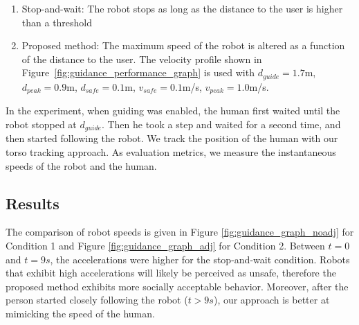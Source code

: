 \begin{enumerate}
\item Stop-and-wait: The robot stops as long as the distance to the user is higher than a threshold
\item Proposed method: The maximum speed of the robot is altered as a function of the distance to the user. The velocity profile shown in Figure~\ref{fig:guidance_performance_graph} is used with $d_{guide}=1.7$m, $d_{peak}=0.9$m, $d_{safe}=0.1$m, $v_{safe}=0.1$m/s, $v_{peak}=1.0$m/s.
\end{enumerate}

In the experiment, when guiding was enabled, the human first waited until the robot stopped at $d_{guide}$. Then he took a step and waited for a second time, and then started following the robot. We track the position of the human with our torso tracking approach. As evaluation metrics, we measure the instantaneous speeds of the robot and the human.

\subsection{Results}
\label{sec:guidance_results}

The comparison of robot speeds is given in Figure \ref{fig:guidance_graph_noadj} for Condition 1 and Figure \ref{fig:guidance_graph_adj} for Condition 2. Between $t=0$ and $t=9s$, the accelerations were higher for the stop-and-wait condition. Robots that exhibit high accelerations will likely be perceived as unsafe, therefore the proposed method exhibits more socially acceptable behavior. Moreover, after the person started closely following the robot ($t >9s$), our approach is better at mimicking the speed of the human.

